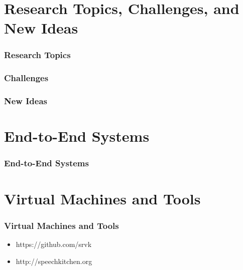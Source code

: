 \section{Research Topics, Challenges, and New Ideas}

\begin{frame}
  \frametitle{Research Topics}
\end{frame}

\begin{frame}
  \frametitle{Challenges}
\end{frame}

\begin{frame}
  \frametitle{New Ideas}
\end{frame}

\section{End-to-End Systems}

\begin{frame}
  \frametitle{End-to-End Systems}
\end{frame}

\section{Virtual Machines and Tools}

\begin{frame}
  \frametitle{Virtual Machines and Tools}
  \begin{itemize}
  \item https://github.com/srvk
  \item http://speechkitchen.org
  \end{itemize}
  
  \cite{quesst:icassp2015,metze:is2015,yajie-lstm:is2015,yajie-robust:is2015,yashesh:is2015,yajie:taslp2015,eesen,trecvid:2015,eesen-icassp,wang2016icassp,w4a:2016,icmr2016,miao:is2016,vms:is2016,shared:is2016,yash:is2016,e2echapter,dnnbook}
\end{frame}
